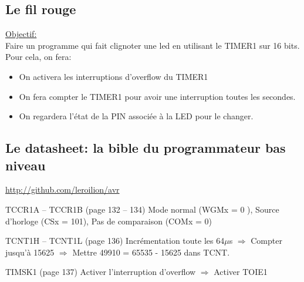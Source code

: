\documentclass{beamer}
\def\Pause{2}
\begin{document}
\subsection{Le fil rouge}

\begin{frame}
  \underline{Objectif:}\\
  Faire un programme qui fait clignoter une led en utilisant le TIMER1 sur 16 bits.\\Pour cela, on fera:\\
  \begin{itemize}
\ifthenelse{\equal{\Pause}{1}}
{
  \pause
}{}
    \item On activera les interruptions d'overflow du TIMER1
\ifthenelse{\equal{\Pause}{1}}
{
  \pause
}{}
    \item On fera compter le TIMER1 pour avoir une interruption toutes les secondes.
\ifthenelse{\equal{\Pause}{1}}
{
  \pause
}{}
    \item On regardera l'\'etat de la PIN associ\'ee \`a la LED pour le changer.
  \end{itemize}
\end{frame}


\subsection{Le datasheet: la bible du programmateur bas niveau}

\begin{frame}
  \hyperlink{http://github.com/leroilion/avr/tree/master/datasheet/Atmegaxx8.pdf}{http://github.com/leroilion/avr}
\ifthenelse{\equal{\Pause}{1}}
{
  \pause
}{}
  \begin{block}{TCCR1A -- TCCR1B (page 132 -- 134)}
    Mode normal (WGMx = 0 ), Source d'horloge (CSx = 101), Pas de comparaison (COMx = 0) 
  \end{block}
\ifthenelse{\equal{\Pause}{1}}
{
  \pause
}{}
  \begin{block}{TCNT1H -- TCNT1L (page 136) }
    Incr\'ementation toute les 64$\mu$s \pause $\Longrightarrow$ Compter jusqu'\`a 15625 \pause $\Longrightarrow$ Mettre 49910 = 65535 - 15625 dans TCNT.
  \end{block}
\ifthenelse{\equal{\Pause}{1}}
{
  \pause
}{}
  \begin{block}{TIMSK1 (page 137)}
    Activer l'interruption d'overflow \pause $\Longrightarrow$ Activer TOIE1
  \end{block}
\end{frame}
\end{document}
